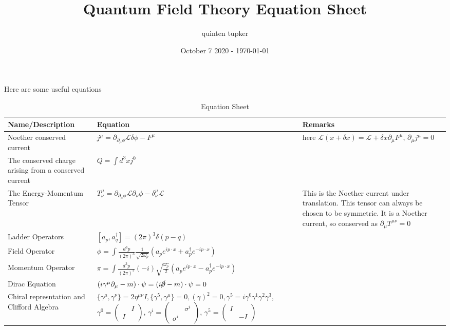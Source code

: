 \documentclass{article}
\title{Quantum Field Theory Equation Sheet}
\author{quinten tupker}
\date{October 7 2020 - \today}
\theoremstyle{definition}
\begin{document}
\maketitle

Here are some useful equations

\begin{table}[H]
  \caption{Equation Sheet}
  \begin{adjustbox}{center}
    \begin{tabular}{|p{5cm}|p{10cm}|p{5cm}|}
      \hline
      \label{equations_1}
      Name/Description & Equation & Remarks \\ \hline
      Noether conserved current & $j^\mu = \partial_{\partial_\mu \phi} \mathcal{L} \delta \phi - F^\mu$ & here $\mathcal{L}(x + \delta x) = \mathcal{L} + \delta x \partial_\mu F^\mu$, $\partial_\mu j^\mu = 0$ \\ \hline
      The conserved charge arising from a conserved current & $Q = \int d^3x j^0$ & \\ \hline
      The Energy-Momentum Tensor & $T^\mu_\nu = \partial_{\partial_\mu \phi} \mathcal{L} \partial_\nu \phi - \delta^\mu_\nu \mathcal{L}$ & This is the Noether current under translation. This tensor can always be chosen to be symmetric. It is a Noether current, so conserved as $\partial_\mu T^{\mu \nu} = 0$ \\ \hline
      Ladder Operators & $[a_p, a_q^\dagger] = (2\pi)^3 \delta(p - q)$ & \\ \hline
      Field Operator & $\phi = \int \frac{d^3p}{(2\pi)^3} \frac{1}{\sqrt{2\omega_p}} (a_p e^{i p \cdot x} + a_p^\dagger e^{-i p \cdot x})$ & \\ \hline
      Momentum Operator & $\pi = \int \frac{d^3p}{(2\pi)^3} (-i) \sqrt{\frac{\omega_p}{2}} (a_p e^{i p \cdot x} - a_p^\dagger e^{-ip \cdot x})$ & \\ \hline
      Dirac Equation & $(i \gamma^\mu \partial_\mu - m) \cdot \psi = (i \cancel{\partial} - m) \cdot \psi = 0$ & \\ \hline
      Chiral represntation and Clifford Algebra & $\{\gamma^\mu, \gamma^\nu \} = 2\eta^{\mu \nu}I, \{\gamma^5, \gamma^\mu\} = 0, (\gamma)^2 = 0, \gamma^5 = i\gamma^0 \gamma^1 \gamma^2 \gamma^3$, $\gamma^0 = \begin{pmatrix} & I \\ I & \end{pmatrix}$, $\gamma^i = \begin{pmatrix} & \sigma^i \\ \sigma^i & \end{pmatrix}$, $\gamma^5 = \begin{pmatrix} I & \\ & -I \end{pmatrix}$ & \\ \hline

\end{tabular}
\end{adjustbox}
\end{table}
\end{document}
